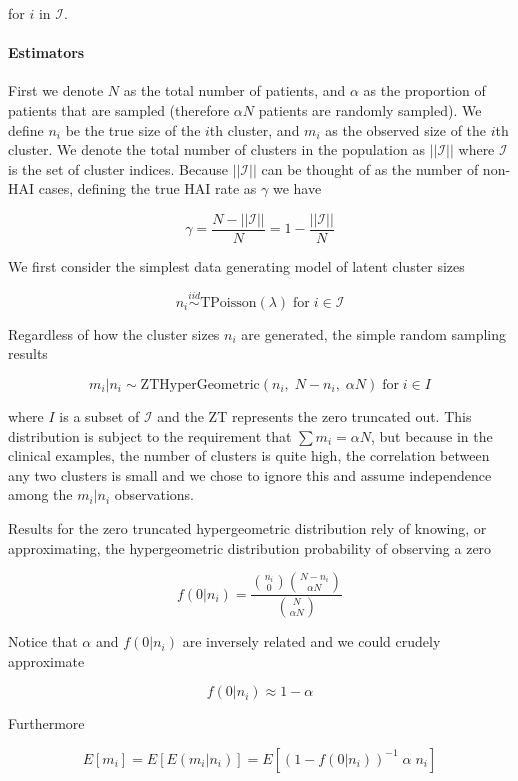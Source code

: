 \documentclass[]{article}
\let\oldparagraph\paragraph
\renewcommand{\paragraph}[1]{\oldparagraph{#1}\mbox{}}
\begin{document}
for \(i\) in \(\mathcal{I}\).

\hypertarget{estimators}{%
\paragraph{Estimators}\label{estimators}}

First we denote \(N\) as the total number of patients, and \(\alpha\) as
the proportion of patients that are sampled (therefore \(\alpha N\)
patients are randomly sampled). We define \(n_i\) be the true size of
the \(i\)th cluster, and \(m_i\) as the observed size of the \(i\)th
cluster. We denote the total number of clusters in the population as
\(||\mathcal{I}||\) where \(\mathcal{I}\) is the set of cluster indices.
Because \(||\mathcal{I}||\) can be thought of as the number of non-HAI
cases, defining the true HAI rate as \(\gamma\) we have

\[\gamma = \frac{N - ||\mathcal{I}||}{N} = 1 - \frac{||\mathcal{I}||}{N}\]

We first consider the simplest data generating model of latent cluster
sizes

\[n_i \stackrel{iid}{\sim} \textrm{TPoisson}(\lambda) \; \textrm{for} \; i\in \mathcal{I}\]

Regardless of how the cluster sizes \(n_i\) are generated, the simple
random sampling results

\[m_i | n_i \sim \textrm{ZTHyperGeometric}(n_i, \; N-n_i, \;\alpha N) \; \textrm{for}\; i \in I\]

where \(I\) is a subset of \(\mathcal{I}\) and the ZT represents the
zero truncated out. This distribution is subject to the requirement that
\(\sum m_i = \alpha N\), but because in the clinical examples, the
number of clusters is quite high, the correlation between any two
clusters is small and we chose to ignore this and assume independence
among the \(m_i | n_i\) observations.

Results for the zero truncated hypergeometric distribution rely of
knowing, or approximating, the hypergeometric distribution probability
of observing a zero

\[f(0|n_i) =  \frac{ {n_i \choose 0}{N-n_i \choose \alpha N} }{ {N \choose \alpha N}}\]

Notice that \(\alpha\) and \(f(0|n_i)\) are inversely related and we
could crudely approximate

\[f(0|n_i) \approx 1-\alpha\]

Furthermore

\[E[m_i] = E[ E(m_i|n_i)] = E[ (1-f(0|n_i))^{-1} \;\alpha \;n_i]\]
\end{document}
